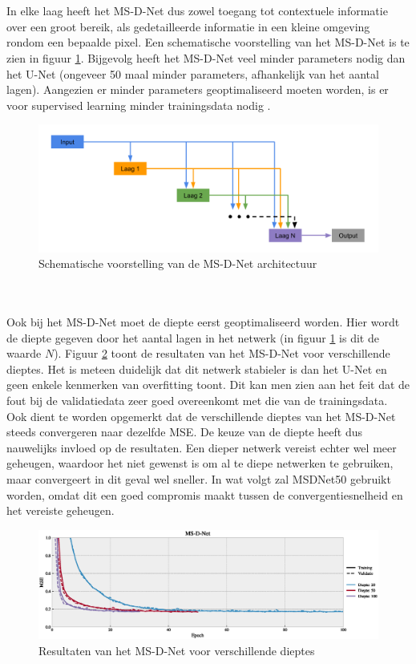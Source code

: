\documentclass{report}
\begin{document}
\\ \\
In elke laag heeft het MS-D-Net dus zowel toegang tot contextuele informatie over een groot bereik, als gedetailleerde informatie in een kleine omgeving rondom een bepaalde pixel. Een schematische voorstelling van het MS-D-Net is te zien in figuur \ref{fig:tem_msdnet}. Bijgevolg heeft het MS-D-Net veel minder parameters nodig dan het U-Net (ongeveer 50 maal minder parameters, afhankelijk van het aantal lagen). Aangezien er minder parameters geoptimaliseerd moeten worden, is er voor supervised learning minder trainingsdata nodig \cite{paper:msdnet}.
\begin{figure}[h!]
	\centering
	\includegraphics[width=15cm]{images/tem/msdnet.png}
	\caption{Schematische voorstelling van de MS-D-Net architectuur}
	\label{fig:tem_msdnet}
\end{figure}
\\ \\
Ook bij het MS-D-Net moet de diepte eerst geoptimaliseerd worden. Hier wordt de diepte gegeven door het aantal lagen in het netwerk (in figuur \ref{fig:tem_msdnet} is dit de waarde $N$). Figuur \ref{fig:nets_msdnet_depth} toont de resultaten van het MS-D-Net voor verschillende dieptes. Het is meteen duidelijk dat dit netwerk stabieler is dan het U-Net en geen enkele kenmerken van overfitting toont. Dit kan men zien aan het feit dat de fout bij de validatiedata zeer goed overeenkomt met die van de trainingsdata. Ook dient te worden opgemerkt dat de verschillende dieptes van het MS-D-Net steeds convergeren naar dezelfde MSE. De keuze van de diepte heeft dus nauwelijks invloed op de resultaten. Een dieper netwerk vereist echter wel meer geheugen, waardoor het niet gewenst is om al te diepe netwerken te gebruiken, maar convergeert in dit geval wel sneller. In wat volgt zal MSDNet50 gebruikt worden, omdat dit een goed compromis maakt tussen de convergentiesnelheid en het vereiste geheugen.
\begin{figure}[h!]
	\centering
	\includegraphics[width=15cm]{images/nets/msdnet_depth.eps}
	\caption{Resultaten van het MS-D-Net voor verschillende dieptes}
	\label{fig:nets_msdnet_depth}
\end{figure}
\end{document}
